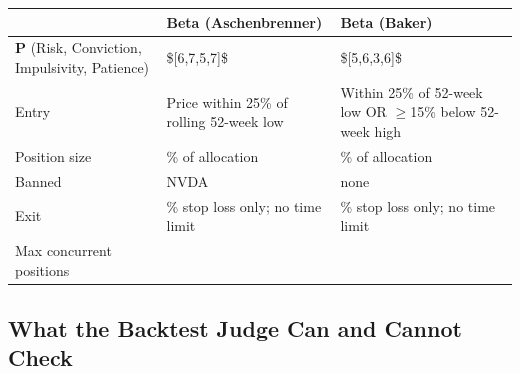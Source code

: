 \documentclass[11pt]{article}
\begin{document}
{\def\LTcaptype{none} %
{\small
\begin{longtable}{@{}
  >{\raggedright\arraybackslash}p{}
  >{\raggedright\arraybackslash}p{}
  >{\raggedright\arraybackslash}p{}@{}}
\toprule\noalign{}
\begin{minipage}[b]{\linewidth}\raggedright
\end{minipage} & \begin{minipage}[b]{\linewidth}\raggedright
Beta (Aschenbrenner)
\end{minipage} & \begin{minipage}[b]{\linewidth}\raggedright
Beta (Baker)
\end{minipage} \\
\midrule\noalign{}
\endhead
\bottomrule\noalign{}
\endlastfoot
\renewcommand{\arraystretch}{1.15}
\(\mathbf{P}\) (Risk, Conviction, Impulsivity, Patience) & \${[}6,7,5,7{]}\$ & \${[}5,6,3,6{]}\$ \\
Entry & Price within 25\% of rolling 52-week low & Within 25\% of 52-week low OR $\geq$15\% below 52-week high \\
Position size & 20\% of allocation & 25\% of allocation \\
Banned & NVDA & none \\
Exit & 10\% stop loss only; no time limit & 10\% stop loss only; no time limit \\
Max concurrent positions & 6 & 5 \\
\end{longtable}}
}

\subsection{What the Backtest Judge Can and Cannot Check}\label{what-the-backtest-judge-can-and-cannot-check}
\end{document}
